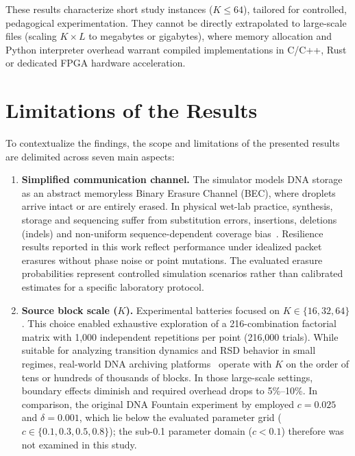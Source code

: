 These results characterize short study instances ($K \le 64$), tailored for controlled, pedagogical experimentation. They cannot be directly extrapolated to large-scale files (scaling $K \times L$ to megabytes or gigabytes), where memory allocation and Python interpreter overhead warrant compiled implementations in C/C++, Rust or dedicated FPGA hardware acceleration.

\section{Limitations of the Results}
\label{sec:results_limitations}

To contextualize the findings, the scope and limitations of the presented results are delimited across seven main aspects:

\begin{enumerate}
    \item \textbf{Simplified communication channel.} The simulator models DNA storage as an abstract memoryless Binary Erasure Channel (BEC), where droplets arrive intact or are entirely erased. In physical wet-lab practice, synthesis, storage and sequencing suffer from substitution errors, insertions, deletions (indels) and non-uniform sequence-dependent coverage bias~\cite{heckel2019, shomorony2022}. Resilience results reported in this work reflect performance under idealized packet erasures without phase noise or point mutations. The evaluated erasure probabilities represent controlled simulation scenarios rather than calibrated estimates for a specific laboratory protocol.
    
    \item \textbf{Source block scale ($K$).} Experimental batteries focused on $K \in \{16, 32, 64\}$. This choice enabled exhaustive exploration of a 216-combination factorial matrix with 1,000 independent repetitions per point (216,000 trials). While suitable for analyzing transition dynamics and RSD behavior in small regimes, real-world DNA archiving platforms~\cite{erlich2017} operate with $K$ on the order of tens or hundreds of thousands of blocks. In those large-scale settings, boundary effects diminish and required overhead drops to 5\%--10\%. In comparison, the original DNA Fountain experiment by  employed $c = 0.025$ and $\delta = 0.001$, which lie below the evaluated parameter grid ($c \in \{0.1, 0.3, 0.5, 0.8\}$); the sub-0.1 parameter domain ($c < 0.1$) therefore was not examined in this study.
    

\end{enumerate}
